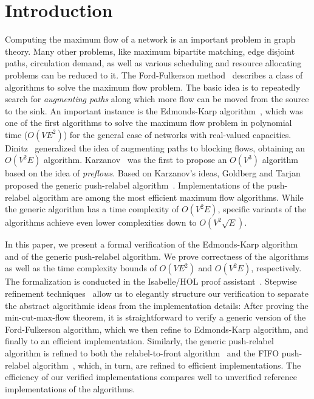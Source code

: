 \documentclass[smallcondensed]{svjour3}     %
\begin{document}
\section{Introduction}
Computing the maximum flow of a network is an important problem in graph theory.
Many other problems, like maximum bipartite matching, edge disjoint paths, circulation demand, as well as various scheduling and resource allocating problems can be reduced to it.
The Ford-Fulkerson method~\cite{FF56} describes a class of algorithms to solve the maximum flow problem. 
The basic idea is to repeatedly search for \emph{augmenting paths} along which more flow can be moved from the source to the sink.
An important instance is the Edmonds-Karp algorithm~\cite{EK72},
which was one of the first algorithms to solve the maximum flow problem in polynomial time ($O(VE^2)$) for the general case of networks with real-valued capacities.
Dinitz~\cite{Di06} generalized the idea of augmenting paths to blocking flows, obtaining an $O(V^2E)$ algorithm. 
Karzanov~\cite{Ka74} was the first to propose an $O(V^3)$ algorithm based on the idea of \emph{preflows}. Based on Karzanov's ideas, Goldberg and Tarjan proposed
the generic push-relabel algorithm~\cite{GoTa88}.
Implementations of the push-relabel algorithm are among the most efficient maximum flow algorithms. While the generic algorithm has a time complexity of $O(V^2E)$,
specific variants of the algorithms achieve even lower complexities down to $O(V^2\sqrt{E})$.

In this paper, we present a formal verification of the Edmonds-Karp algorithm and of the generic push-relabel algorithm.
We prove correctness of the algorithms as well as the time complexity bounds of $O(VE^2)$ and $O(V^2E)$, respectively. 
The formalization is conducted in the Isabelle/HOL proof assistant~\cite{NPW02}. 
Stepwise refinement techniques~\cite{Wirth71,Back78,BaWr98} allow us to elegantly structure our verification to separate the abstract algorithmic ideas from
the implementation details: After proving the min-cut-max-flow theorem, it is straightforward to verify a generic version of the Ford-Fulkerson algorithm,
which we then refine to Edmonds-Karp algorithm, and finally to an efficient implementation. 
Similarly, the generic push-relabel algorithm is refined to both the relabel-to-front algorithm~\cite{CLRS09} and the FIFO push-relabel algorithm~\cite{GoTa88},
which, in turn, are refined to efficient implementations. The efficiency of our verified implementations compares well to unverified reference implementations of 
the algorithms.
\end{document}
